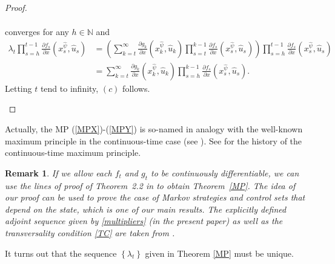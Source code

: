 \documentclass[3p]{elsarticle}
\newcommand{\natu}{\mathbb N}
\newtheorem{remark}[thm]{Remark}
\begin{document}
\begin{proof}
\begin{enumerate}
\begin{align*}
			\end{align*}
			converges for any $h\in\natu$ and
			\begin{align*}
			\lambda_t \prod_{s=h}^{t-1}\frac{\partial f_s}{\partial x}(x_s^{\hat\psi},\hat u_s)&=\left( \sum_{k=t}^\infty\frac{\partial g_k}{\partial x}(x_k^{\hat{\psi}},\hat u_k)\prod_{s=t}^{k-1}\frac{\partial f_s}{\partial x}(x_s^{\hat{\psi}},\hat u_s)\right)  \prod_{s=h}^{t-1}\frac{\partial f_s}{\partial x}(x_s^{\hat\psi},\hat u_s)\\
			&=\sum_{k=t}^\infty\frac{\partial g_k}{\partial x}(x_k^{\hat{\psi}},\hat u_k)\prod_{s=h}^{k-1}\frac{\partial f_s}{\partial x}(x_s^{\hat{\psi}},\hat u_s).
			\end{align*}
			Letting $t$ tend to infinity, $(c)$ follows.
		\end{enumerate}
	\end{proof}
	
	Actually, the MP (\ref{MPX})-(\ref{MPY}) is so-named
	in analogy with the well-known maximum principle in the continuous-time case (see \cite{Pont}). See \cite{HistoryMP} for the history of the continuous-time maximum principle.
	
	\begin{remark}
		If we allow each $f_t$ and $g_t$ to be continuously differentiable, we can use the lines of proof of Theorem~2.2 in \cite{Multipliers} to obtain Theorem~\ref{MP}. The idea of our proof can be used to prove the case of Markov strategies and control sets that depend on the state, which is one of our main results. The explicitly defined adjoint sequence given by \eqref{multipliers} (in the present paper) as well as the transversality condition \eqref{TC} are taken from \cite{Multipliers}.
	\end{remark}
	
	
	
	It turns out that the sequence $\left\lbrace \lambda_t \right\rbrace $ given in Theorem \ref{MP} must be unique.
	
\end{document}
